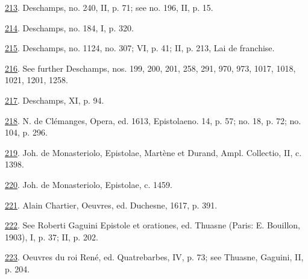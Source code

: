 \protect\hypertarget{23_NOTES.xhtmlux5cux23id_1512}{\protect\hyperlink{10_Chapter_Three__THE_HEROIC_DREAM.xhtmlux5cux23id_1511}{213}}.
Deschamps, no. 240, II, p. 71; see no. 196, II, p. 15.

\protect\hypertarget{23_NOTES.xhtmlux5cux23id_1510}{\protect\hyperlink{10_Chapter_Three__THE_HEROIC_DREAM.xhtmlux5cux23id_1509}{214}}.
Deschamps, no. 184, I, p. 320.

\protect\hypertarget{23_NOTES.xhtmlux5cux23id_1508}{\protect\hyperlink{10_Chapter_Three__THE_HEROIC_DREAM.xhtmlux5cux23id_1507}{215}}.
Deschamps, no. 1124, no. 307; VI, p. 41; II, p. 213, Lai de franchise.

\protect\hypertarget{23_NOTES.xhtmlux5cux23id_1506}{\protect\hyperlink{10_Chapter_Three__THE_HEROIC_DREAM.xhtmlux5cux23id_1505}{216}}.
See further Deschamps, nos. 199, 200, 201, 258, 291, 970, 973, 1017,
1018, 1021, 1201, 1258.

\protect\hypertarget{23_NOTES.xhtmlux5cux23id_1504}{\protect\hyperlink{10_Chapter_Three__THE_HEROIC_DREAM.xhtmlux5cux23id_1503}{217}}.
Deschamps, XI, p. 94.

\protect\hypertarget{23_NOTES.xhtmlux5cux23id_1502}{\protect\hyperlink{10_Chapter_Three__THE_HEROIC_DREAM.xhtmlux5cux23id_1501}{218}}.
N. de Clémanges, Opera, ed. 1613, Epistolaeno. 14, p. 57; no. 18, p. 72;
no. 104, p. 296.

\protect\hypertarget{23_NOTES.xhtmlux5cux23id_1500}{\protect\hyperlink{10_Chapter_Three__THE_HEROIC_DREAM.xhtmlux5cux23id_1499}{219}}.
Joh. de Monasteriolo, Epistolae, Martène et Durand, Ampl. Collectio, II,
c. 1398.

\protect\hypertarget{23_NOTES.xhtmlux5cux23id_1498}{\protect\hyperlink{10_Chapter_Three__THE_HEROIC_DREAM.xhtmlux5cux23id_1497}{220}}.
Joh. de Monasteriolo, Epistolae, c. 1459.

\protect\hypertarget{23_NOTES.xhtmlux5cux23id_1496}{\protect\hyperlink{10_Chapter_Three__THE_HEROIC_DREAM.xhtmlux5cux23id_1495}{221}}.
Alain Chartier, Oeuvres, ed. Duchesne, 1617, p. 391.

\protect\hypertarget{23_NOTES.xhtmlux5cux23id_1494}{\protect\hyperlink{10_Chapter_Three__THE_HEROIC_DREAM.xhtmlux5cux23id_1493}{222}}.
See Roberti Gaguini Epistole et orationes, ed. Thuasne (Paris: E.
Bouillon, 1903), I, p. 37; II, p. 202.

\protect\hypertarget{23_NOTES.xhtmlux5cux23id_1492}{\protect\hyperlink{10_Chapter_Three__THE_HEROIC_DREAM.xhtmlux5cux23id_1491}{223}}.
Oeuvres du roi René, ed. Quatrebarbes, IV, p. 73; see Thuasne, Gaguini,
II, p. 204.

